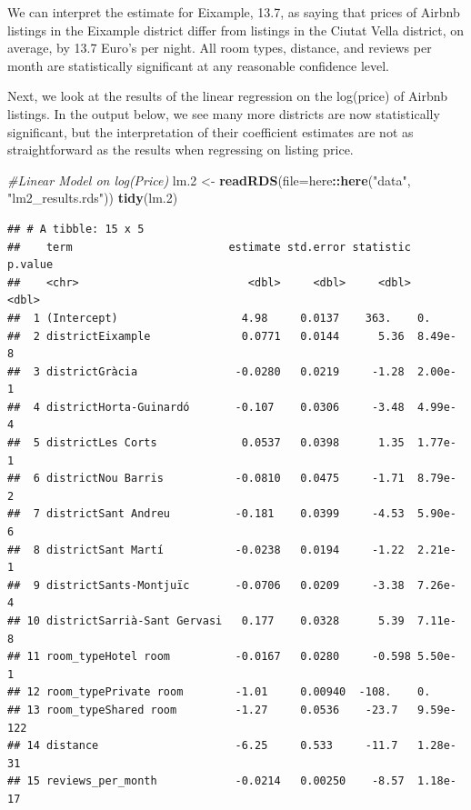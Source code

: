 \documentclass[]{article}
\newenvironment{Shaded}{\begin{snugshade}}{\end{snugshade}}
\newcommand{\CommentTok}[1]{\textcolor[rgb]{0.56,0.35,0.01}{\textit{#1}}}
\newcommand{\DataTypeTok}[1]{\textcolor[rgb]{0.13,0.29,0.53}{#1}}
\newcommand{\FloatTok}[1]{\textcolor[rgb]{0.00,0.00,0.81}{#1}}
\newcommand{\KeywordTok}[1]{\textcolor[rgb]{0.13,0.29,0.53}{\textbf{#1}}}
\newcommand{\NormalTok}[1]{#1}
\newcommand{\OperatorTok}[1]{\textcolor[rgb]{0.81,0.36,0.00}{\textbf{#1}}}
\newcommand{\StringTok}[1]{\textcolor[rgb]{0.31,0.60,0.02}{#1}}
\begin{document}
We can interpret the estimate for Eixample, 13.7, as saying that prices
of Airbnb listings in the Eixample district differ from listings in the
Ciutat Vella district, on average, by 13.7 Euro's per night. All room
types, distance, and reviews per month are statistically significant at
any reasonable confidence level.

Next, we look at the results of the linear regression on the log(price)
of Airbnb listings. In the output below, we see many more districts are
now statistically significant, but the interpretation of their
coefficient estimates are not as straightforward as the results when
regressing on listing price.

\begin{Shaded}
\begin{Highlighting}[]
\CommentTok{#Linear Model on log(Price)}
\NormalTok{lm}\FloatTok{.2}\NormalTok{ <-}\StringTok{ }\KeywordTok{readRDS}\NormalTok{(}\DataTypeTok{file=}\NormalTok{here}\OperatorTok{::}\KeywordTok{here}\NormalTok{(}\StringTok{"data"}\NormalTok{, }\StringTok{"lm2_results.rds"}\NormalTok{))}
\KeywordTok{tidy}\NormalTok{(lm}\FloatTok{.2}\NormalTok{)}
\end{Highlighting}
\end{Shaded}

\begin{verbatim}
## # A tibble: 15 x 5
##    term                        estimate std.error statistic   p.value
##    <chr>                          <dbl>     <dbl>     <dbl>     <dbl>
##  1 (Intercept)                   4.98     0.0137    363.    0.       
##  2 districtEixample              0.0771   0.0144      5.36  8.49e-  8
##  3 districtGràcia               -0.0280   0.0219     -1.28  2.00e-  1
##  4 districtHorta-Guinardó       -0.107    0.0306     -3.48  4.99e-  4
##  5 districtLes Corts             0.0537   0.0398      1.35  1.77e-  1
##  6 districtNou Barris           -0.0810   0.0475     -1.71  8.79e-  2
##  7 districtSant Andreu          -0.181    0.0399     -4.53  5.90e-  6
##  8 districtSant Martí           -0.0238   0.0194     -1.22  2.21e-  1
##  9 districtSants-Montjuïc       -0.0706   0.0209     -3.38  7.26e-  4
## 10 districtSarrià-Sant Gervasi   0.177    0.0328      5.39  7.11e-  8
## 11 room_typeHotel room          -0.0167   0.0280     -0.598 5.50e-  1
## 12 room_typePrivate room        -1.01     0.00940  -108.    0.       
## 13 room_typeShared room         -1.27     0.0536    -23.7   9.59e-122
## 14 distance                     -6.25     0.533     -11.7   1.28e- 31
## 15 reviews_per_month            -0.0214   0.00250    -8.57  1.18e- 17
\end{verbatim}
\end{document}
